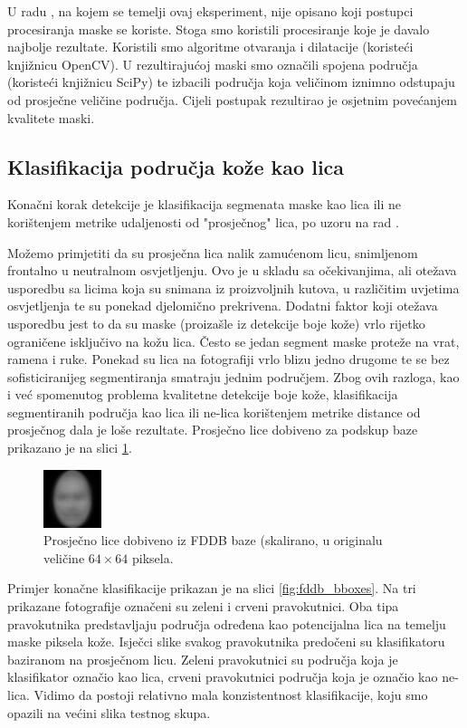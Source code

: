 \documentclass[times, utf8, seminar, numeric]{fer}
\begin{document}
U radu \cite{conf/isda/ChandrappaR12}, na kojem se
temelji ovaj eksperiment, nije opisano koji postupci procesiranja maske se koriste. Stoga smo
koristili procesiranje koje je davalo najbolje rezultate. Koristili smo algoritme otvaranja i
dilatacije (koristeći knjižnicu OpenCV). U rezultirajućoj maski smo označili spojena područja
(koristeći knjižnicu SciPy) te izbacili područja koja veličinom iznimno odstupaju od prosječne
veličine područja. Cijeli postupak rezultirao je osjetnim povećanjem kvalitete maski.

\subsection{Klasifikacija područja kože kao lica}

Konačni korak detekcije je klasifikacija segmenata maske kao lica ili ne korištenjem
metrike udaljenosti od "prosječnog" lica, po uzoru na rad \cite{conf/isda/ChandrappaR12}.


Možemo primjetiti da su prosječna lica nalik zamućenom licu, snimljenom frontalno u neutralnom osvjetljenju.
Ovo je u skladu sa očekivanjima, ali otežava usporedbu sa licima koja su snimana iz proizvoljnih kutova,
u različitim uvjetima osvjetljenja te su ponekad djelomično prekrivena. Dodatni faktor koji otežava usporedbu
jest to da su maske (proizašle iz detekcije boje kože) vrlo rijetko ograničene isključivo na kožu lica. Često
se jedan segment maske proteže na vrat, ramena i ruke. Ponekad su lica na fotografiji vrlo blizu jedno drugome
te se bez sofisticiranijeg segmentiranja smatraju jednim područjem.
Zbog ovih razloga, kao i već spomenutog problema kvalitetne detekcije boje kože, klasifikacija segmentiranih
područja kao lica ili ne-lica korištenjem metrike distance od prosječnog dala je loše rezultate. Prosječno
lice dobiveno za podskup baze prikazano je na slici \ref{fig:fddb_avg_face}.

\begin{figure}[!htb]
\centering
\includegraphics{raw/avg_face.png}
\caption{Prosječno lice dobiveno iz FDDB baze (skalirano, u originalu veličine $64 \times 64$ piksela.}
\label{fig:fddb_avg_face}
\end{figure}

Primjer konačne klasifikacije prikazan je na slici \ref{fig:fddb_bboxes}. Na tri prikazane fotografije
označeni su zeleni i crveni pravokutnici. Oba tipa pravokutnika predstavljaju područja određena
kao potencijalna lica na temelju maske piksela kože. Isječci slike svakog pravokutnika predočeni su
klasifikatoru baziranom na prosječnom licu. Zeleni pravokutnici su područja koja je klasifikator označio
kao lica, crveni pravokutnici područja koja je označio kao ne-lica. Vidimo da postoji relativno mala
konzistentnost klasifikacije, koju smo opazili na većini slika testnog skupa.
\end{document}
